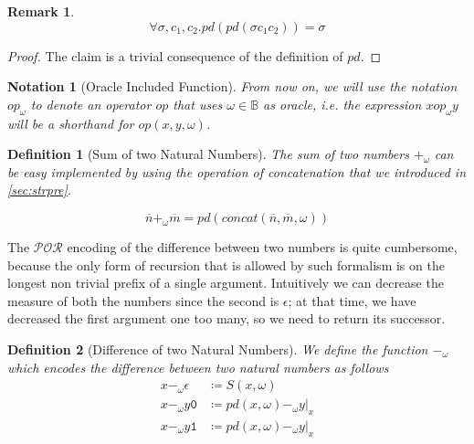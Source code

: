\documentclass[10pt]{amsart}
\newcommand{\POR}{\mathcal{POR}}
\newcommand{\zero}{\mathtt{0}}
\newcommand{\one}{\mathtt{1}}
\newcommand{\vone}{x}
\newcommand{\vtwo}{y}
\newcommand{\none}{n}
\newcommand{\ntwo}{m}
\newcommand{\BB}{\mathbb{B}}
\newcommand{\mci}[1]{c_{#1}}
\newcommand{\oone}{\omega}
\newcommand{\concat}{concat}
\newcommand{\pred}{pd}
\newtheorem{defn}{Definition}
\newtheorem{remark}{Remark}
\newtheorem{notation}{Notation}
\begin{document}
\begin{remark}
\[
\forall \sigma, \mci 1, \mci 2. \pred(\pred(\sigma\mci1\mci2))=\sigma
\]
\end{remark}

\begin{proof}
The claim is a trivial consequence of the definition of $\pred$.
\end{proof}

\begin{notation}[Oracle Included Function]
From now on, we will use the notation $op_\oone$ to denote an operator $op$ that uses $\oone \in \BB$ as oracle, i.e. the expression $\vone op_\oone \vtwo$ will be a shorthand for $op(\vone, \vtwo, \oone)$.
\end{notation}

\begin{defn}[Sum of two Natural Numbers]
The sum of two numbers $+_\oone$ can be easy implemented by using the operation of concatenation that we introduced in \ref{sec:strpre}.

\[
\overline \none +_\oone \overline \ntwo = \pred(\concat(\overline n, \overline m, \oone))
\]
\end{defn}


The $\POR$ encoding of the difference between two numbers is quite cumbersome, because the only form of recursion that is allowed by such formalism is on the longest non trivial prefix of a single argument. Intuitively we can decrease the measure of both the numbers since the second is $\epsilon$; at that time, we have decreased the first argument one too many, so we need to return its successor.

\begin{defn}[Difference of two Natural Numbers]
We define the function $-_\oone$ which encodes the difference between two natural numbers as follows
\begin{align*}
\vone -_\oone \epsilon &\coloneqq S(\vone, \oone)\\
\vone -_\oone \vtwo\zero &\coloneqq \pred(\vone, \oone) -_\oone \vtwo|_{\vone}\\
\vone -_\oone \vtwo\one &\coloneqq \pred(\vone, \oone) -_\oone \vtwo|_{\vone}\\
\end{align*}
\end{defn}
\end{document}
